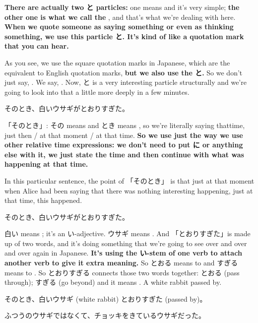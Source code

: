 {\bf There are actually two と particles:} one means  and it's very simple; {\bf the other one is what we call the }, and that's what we're dealing with here. {\bf When we quote someone as saying something or even as thinking something, we use this particle と. It's kind of like a quotation mark that you can hear.}

As you see, we use the square quotation marks in Japanese, which are the equivalent to English quotation marks, {\bf but we also use the と.} So we don't just say, . We say, . Now, と is a very interesting particle structurally and we're going to look into that a little more deeply in a few minutes.

\startblockquote
そのとき、白いウサギがとおりすぎた。
\stopblockquote

{}

「そのとき」: その means  and とき means , so we're literally saying thattime,  just then / at that moment / at that time. {\bf So we use just the way we use other relative time expressions: we don't need to put に or anything else with it, we just state the time and then continue with what was happening at that time.}

In this particular sentence, the point of 「そのとき」 is that just at that moment when Alice had been saying that there was nothing interesting happening, just at that time, this happened.

そのとき、白いウサギがとおりすぎた。

白い means ; it's an い-adjective. ウサギ means . And 「とおりすぎた」is made up of two words, and it's doing something that we're going to see over and over and over again in Japanese. {\bf It's using the い-stem of one verb to attach another verb to give it extra meaning.} So とおる means to  and すぎる means to . So とおりすぎる connects those two words together: とおる (pass through); すぎる (go beyond) and it means . A white rabbit passed by.

{}

そのとき、白いウサギ (white rabbit) とおりすぎた (passed by)。

\thinrule

\startblockquote
ふつうのウサギではなくて、チョッキをきているウサギだった。
\stopblockquote

